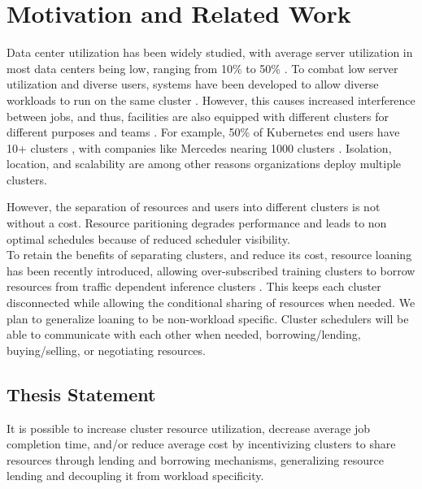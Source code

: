 \section{Motivation and Related Work}
Data center utilization has been widely studied, with average server utilization in most data centers being low, 
ranging from 10\% to 50\%
\cite{lo_heracles_2015}. 
To combat low server utilization and diverse users, systems have been developed to allow diverse workloads to run 
on the same cluster \cite{bhattacharya_hierarchical_2013, hindman_mesos_nodate}. 
However, this causes increased interference between jobs, and thus, 
facilities are also equipped with different clusters for different purposes and teams \cite{patel_what_2022, li_lyra_2023}. 
For example, 50\% of Kubernetes \cite{verma_large-scale_2015}
end users have 10+ clusters \cite{noauthor_cncf_2023} 
, with companies like Mercedes nearing 1000 clusters \cite{noauthor_mercedes-benz_2023}.
Isolation, location, and scalability are among other reasons organizations deploy multiple clusters.

However, the separation of resources and users into different clusters is not without a cost. 
Resource paritioning degrades performance %
and leads to non optimal schedules because of reduced scheduler visibility.\\ %

To retain the benefits of separating clusters, and reduce its cost, resource loaning has been recently 
introduced, allowing over-subscribed training clusters to 
borrow resources from traffic dependent inference clusters \cite{li_lyra_2023}. This keeps each cluster disconnected 
while allowing the conditional sharing of resources when needed.
We plan to generalize loaning to be non-workload specific. Cluster schedulers will be able to communicate 
with each other when needed, borrowing/lending, buying/selling, or negotiating resources. %

\subsection{Thesis Statement}
It is possible to increase cluster resource utilization, decrease average job completion time, 
and/or reduce average cost by incentivizing clusters to share resources through lending and borrowing mechanisms, 
generalizing resource lending and decoupling it from workload specificity.
